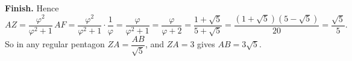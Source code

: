 \textbf{Finish.} Hence
\[AZ=\dfrac{\varphi^2}{\varphi^2+1}\,AF=\dfrac{\varphi^2}{\varphi^2+1}\cdot\dfrac1\varphi=\dfrac{\varphi}{\varphi^2+1}=\dfrac{\varphi}{\varphi+2}=\dfrac{1+\sqrt5}{5+\sqrt5}=\dfrac{(1+\sqrt5)(5-\sqrt5)}{20}=\dfrac{\sqrt5}{5}.\]
So in any regular pentagon $ZA=\dfrac{AB}{\sqrt5}$, and $ZA=3$ gives $AB=\boxed{3\sqrt5}$.
